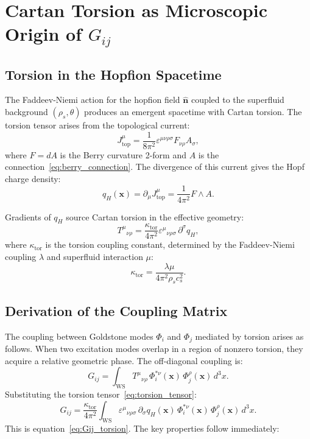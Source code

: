 \documentclass[11pt,letterpaper]{article}
\begin{document}
\section{Cartan Torsion as Microscopic Origin of $G_{ij}$}
\label{sec:torsion}

\subsection{Torsion in the Hopfion Spacetime}

The Faddeev-Niemi action for the hopfion field $\hat{\mathbf{n}}$ coupled to the superfluid background $(\rho_s, \theta)$ produces an emergent spacetime with Cartan torsion. The torsion tensor arises from the topological current:
\begin{equation}
J_{\text{top}}^\mu = \frac{1}{8\pi^2} \varepsilon^{\mu\nu\rho\sigma} F_{\nu\rho} A_\sigma,
\end{equation}
where $F = dA$ is the Berry curvature 2-form and $A$ is the connection~\eqref{eq:berry_connection}. The divergence of this current gives the Hopf charge density:
\begin{equation}
q_H(\mathbf{x}) = \partial_\mu J_{\text{top}}^\mu = \frac{1}{4\pi^2} F \wedge A.
\end{equation}

Gradients of $q_H$ source Cartan torsion in the effective geometry:
\begin{equation}
T^\mu{}_{\nu\rho} = \frac{\kappa_{\text{tor}}}{4\pi^2} \varepsilon^\mu{}_{\nu\rho\sigma}\, \partial^\sigma q_H,
\label{eq:torsion_tensor}
\end{equation}
where $\kappa_{\text{tor}}$ is the torsion coupling constant, determined by the Faddeev-Niemi coupling $\lambda$ and superfluid interaction $\mu$:
\begin{equation}
\kappa_{\text{tor}} = \frac{\lambda\mu}{4\pi^2 \rho_s c_s^2}.
\end{equation}

\subsection{Derivation of the Coupling Matrix}

The coupling between Goldstone modes $\Phi_i$ and $\Phi_j$ mediated by torsion arises as follows. When two excitation modes overlap in a region of nonzero torsion, they acquire a relative geometric phase. The off-diagonal coupling is:
\begin{equation}
G_{ij} = \int_{\text{WS}} T^\mu{}_{\nu\rho}\, \Phi_i^{*\nu}(\mathbf{x})\, \Phi_j^\rho(\mathbf{x})\, d^3x.
\end{equation}
Substituting the torsion tensor~\eqref{eq:torsion_tensor}:
\begin{equation}
G_{ij} = \frac{\kappa_{\text{tor}}}{4\pi^2} \int_{\text{WS}} \varepsilon^{\mu}{}_{\nu\rho\sigma}\, \partial_\sigma q_H(\mathbf{x})\, \Phi_i^{*\nu}(\mathbf{x})\, \Phi_j^\rho(\mathbf{x})\, d^3x.
\end{equation}
This is equation~\eqref{eq:Gij_torsion}. The key properties follow immediately:
\end{document}

